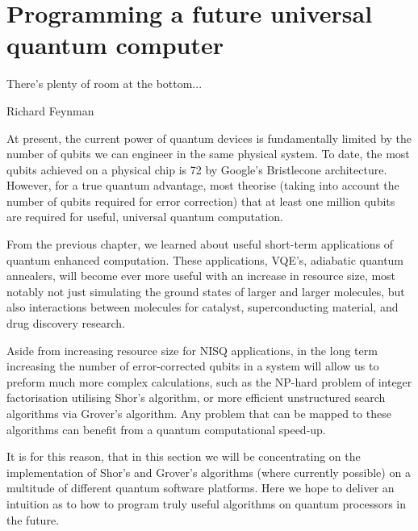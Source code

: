 \chapter{Programming a future universal quantum computer}
\label{chpt:programming}

\epigraph{There's plenty of room at the bottom...}{Richard Feynman}

At present, the current power of quantum devices is fundamentally limited by the number of qubits we can engineer in the same physical system. To date, the most qubits achieved on a physical chip is 72 by Google's Bristlecone architecture. However, for a true quantum advantage, most theorise (taking into account the number of qubits required for error correction) that at least one million qubits are required for useful, universal quantum computation. 

From the previous chapter, we learned about useful short-term applications of quantum enhanced computation. These applications, VQE's, adiabatic quantum annealers, will become ever more useful with an increase in resource size, most notably not just simulating the ground states of larger and larger molecules, but also interactions between molecules for catalyst, superconducting material, and drug discovery research.

Aside from increasing resource size for NISQ applications, in the long term increasing the number of error-corrected qubits in a system will allow us to preform much more complex calculations, such as the NP-hard problem of integer factorisation utilising Shor's algorithm, or more efficient unstructured search algorithms via Grover's algorithm. Any problem that can be mapped to these algorithms can benefit from a quantum computational speed-up. 

It is for this reason, that in this section we will be concentrating on the implementation of Shor's and Grover's algorithms (where currently possible) on a multitude of different quantum software platforms. Here we hope to deliver an intuition as to how to program truly useful algorithms on quantum processors in the future.


